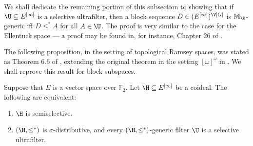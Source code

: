 \documentclass[11pt,reqno]{amsart}
\begin{document}
We shall dedicate the remaining portion of this subsection to showing that if $\U \subseteq E^{[\infty]}$ is a selective ultrafilter, then a block sequence $D \in (E^{[\infty]})^{\V[G]}$ is $\mathbb{M}_\U$-generic iff $D \leq^* A$ for all $A \in \U$. The proof is very similar to the case for the Ellentuck space --- a proof may be found in, for instance, Chapter 26 of \cite{H22}.

The following proposition, in the setting of topological Ramsey spaces, was stated as Theorem 6.6 of \cite{DMN15}, extending the original theorem in the setting $[\omega]^\omega$ in \cite{F98}. We shall reprove this result for block subspaces.

\begin{proposition}
\label{prop:semiselective.adds.selective.ultrafilter}
    Suppose that $E$ is a vector space over $\mathbb{F}_2$. Let $\H \subseteq E^{[\infty]}$ be a coideal. The following are equivalent:
    \begin{enumerate}
        \item $\H$ is semiselective.
        
        \item $(\H,\leq^*)$ is $\sigma$-distributive, and every $(\H,\leq^*)$-generic filter $\U$ is a selective ultrafilter.
    \end{enumerate}
\end{proposition}
\end{document}
